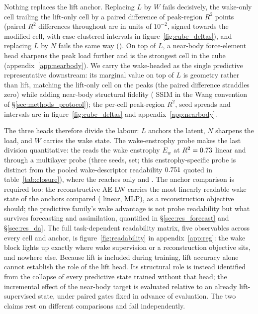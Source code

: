 Nothing replaces the lift anchor. Replacing $L$ by $W$ fails decisively, the
wake-only cell trailing the lift-only cell by a paired difference of
\TcDeltaCwVsClPeak{} peak-region
$R^2$ points (paired $R^2$ differences throughout are in units of $10^{-2}$,
signed towards the modified cell, with
case-clustered intervals in figure~\ref{fig:cube_deltas}), and replacing $L$ by
$N$ fails the same way (\TcDeltaCnVsClPeak). On top of
$L$, a near-body force-element head sharpens the peak load further and is the
strongest cell in the cube (appendix~\ref{app:nearbody}). We carry the
wake-headed \PredState{} as the single predictive representative
downstream: its marginal value on top of $L$ is geometry rather than lift,
matching the lift-only cell on the peaks (the paired difference straddles zero)
while adding near-body structural
fidelity (\TcDeltaClwVsClSsimNb{} SSIM in the Wang convention of
\S\ref{sec:methods_protocol}); the per-cell peak-region $R^2$, seed spreads and
intervals are in figure~\ref{fig:cube_deltas} and appendix~\ref{app:nearbody}.\re

The three heads therefore divide the labour: $L$ anchors the latent, $N$
sharpens the load, and $W$ carries the wake state. The wake-enstrophy
probe makes the last division quantitative: the \PredState{}
reads the wake enstrophy $E_w$ at $R^2 = 0.73$ linear and \EwClwMlp{}
through a multilayer probe (three seeds, \TestSplit{} set; this
enstrophy-specific probe is distinct from the pooled wake-descriptor
readability $0.751$ quoted in table~\ref{tab:closure}), where the
\LiftState{} reaches only \EwClnLin{} and \EwClnMlp. The anchor
comparison is required too: the reconstructive AE-LW carries the most linearly
readable wake state of the anchors compared (\EwAeLwLin{} linear, \EwAeLwMlp{} MLP), as a
reconstruction objective should; the predictive family's wake advantage is
not probe readability but what survives forecasting and assimilation,
quantified in \S\ref{sec:res_forecast} and \S\ref{sec:res_da}. The full
task-dependent readability matrix, five observables across every cell and
anchor, is figure~\ref{fig:readability} in appendix~\ref{app:reg}: the wake block lights up exactly
where wake supervision or a reconstruction objective sits, and nowhere
else. Because lift is included during training, lift accuracy alone cannot
establish the role of the lift head. Its structural role is instead identified
from the collapse of every predictive state trained without that head; the
incremental effect of the near-body target is evaluated relative to an already
lift-supervised state, under paired gates fixed in advance of evaluation. The
two claims rest on different comparisons and fail independently.\re

